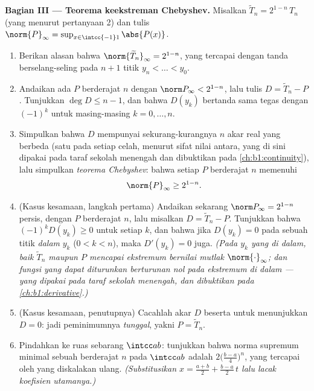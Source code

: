 \begin{problem}
\medskip
\noindent\textbf{Bagian III --- Teorema keekstreman Chebyshev.}
Misalkan $\widetilde T_n = 2^{1-n}\,T_n$ (yang  menurut pertanyaan 2) dan
tulis $\norm{P}_\infty = \sup_{x \in \intcc{-1}1}\abs{P(x)}$.
\begin{enumerate}[resume]
  \item Berikan alasan bahwa $\norm{\widetilde T_n}_\infty = 2^{1-n}$, yang tercapai
        dengan tanda berselang-seling pada $n + 1$ titik $y_n < \dots
        < y_0$.
  \item Andaikan ada $P$  berderajat $n$ dengan
        $\norm P_\infty < 2^{1-n}$, lalu tulis $D = \widetilde T_n -
        P$. Tunjukkan $\deg D \leq n - 1$, dan bahwa $D(y_k)$ bertanda
        sama tegas dengan $(-1)^k$ untuk masing-masing $k = 0, \dots, n$.
  \item Simpulkan bahwa $D$ mempunyai sekurang-kurangnya $n$ akar real yang berbeda
        (satu pada setiap celah, menurut sifat nilai antara, yang di sini dipakai
        pada taraf sekolah menengah dan dibuktikan pada
        \cref{ch:b1:continuity}), lalu simpulkan \emph{teorema
        Chebyshev}: bahwa setiap $P$  berderajat $n$ memenuhi
        \[
        \norm{P}_\infty \geq 2^{1-n} .
        \]
  \item (Kasus kesamaan, langkah pertama) Andaikan sekarang $\norm P_\infty =
        2^{1-n}$ persis, dengan $P$  berderajat $n$, lalu misalkan $D =
        \widetilde T_n - P$. Tunjukkan bahwa $(-1)^kD(y_k) \geq 0$ untuk
        setiap $k$, dan bahwa jika $D(y_k) = 0$ pada sebuah titik
        \emph{dalam} $y_k$ ($0 < k < n$), maka $D'(y_k) = 0$ juga.
        \emph{(Pada $y_k$ yang di dalam, baik $\widetilde T_n$ maupun
        $P$ mencapai ekstremum bernilai mutlak $\norm{\cdot}
        _\infty$; dan fungsi yang dapat diturunkan berturunan nol
        pada ekstremum di dalam --- yang dipakai pada taraf sekolah menengah,
        dan dibuktikan pada \cref{ch:b1:derivative}.)}
  \item (Kasus kesamaan, penutupnya) Cacahlah akar $D$ beserta
         untuk menunjukkan $D = 0$: jadi peminimumnya
        \emph{tunggal}, yakni $P = \widetilde T_n$.
  \item Pindahkan ke ruas sebarang $\intcc ab$: tunjukkan bahwa
        norma supremum minimal sebuah  berderajat $n$ pada
        $\intcc ab$ adalah $2\bigl(\frac{b-a}4\bigr)^n$, yang tercapai oleh
         yang diskalakan ulang. \emph{(Substitusikan $x =
        \frac{a+b}2 + \frac{b-a}2\,t$ lalu lacak koefisien
        utamanya.)}
\end{enumerate}


\end{problem}
